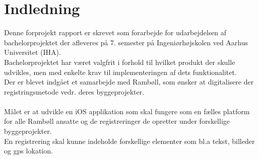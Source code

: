 \chapter{Indledning}
Denne forprojekt rapport er skrevet som forarbejde for udarbejdelsen af bachelorprojektet der afleveres på 7. semester på Ingeniørhøjskolen ved Aarhus Universitet (IHA).\\
Bachelorprojektet har været valgfrit i forhold til hvilket produkt der skulle udvikles, men med
enkelte krav til implementeringen af dets funktionalitet.\\
Der er blevet indgået et samarbejde med Rambøll, som ønsker at digitalisere der registringsmetode vedr. deres byggeprojekter.\\ \\
Målet er at udvikle en iOS applikation som skal fungere som en fælles platform for alle Rambøll ansatte og de registreringer de opretter under forskellige byggeprojekter.\\
En registrering skal kunne indeholde forskellige elementer som bl.a tekst, billeder og gps lokation.